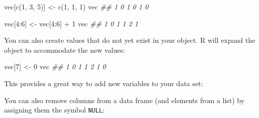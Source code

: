 \documentclass[
  letterpaper,
  DIV=11,
  numbers=noendperiod]{scrbook}
\newenvironment{Shaded}{\begin{snugshade}}{\end{snugshade}}
\newcommand{\ConstantTok}[1]{\textcolor[rgb]{0.56,0.35,0.01}{#1}}
\newcommand{\DecValTok}[1]{\textcolor[rgb]{0.68,0.00,0.00}{#1}}
\newcommand{\DocumentationTok}[1]{\textcolor[rgb]{0.37,0.37,0.37}{\textit{#1}}}
\newcommand{\FunctionTok}[1]{\textcolor[rgb]{0.28,0.35,0.67}{#1}}
\newcommand{\NormalTok}[1]{\textcolor[rgb]{0.00,0.23,0.31}{#1}}
\newcommand{\OtherTok}[1]{\textcolor[rgb]{0.00,0.23,0.31}{#1}}
\newcommand{\SpecialCharTok}[1]{\textcolor[rgb]{0.37,0.37,0.37}{#1}}
\begin{document}
\begin{Shaded}
\begin{Highlighting}[]
\NormalTok{vec[}\FunctionTok{c}\NormalTok{(}\DecValTok{1}\NormalTok{, }\DecValTok{3}\NormalTok{, }\DecValTok{5}\NormalTok{)] }\OtherTok{\textless{}{-}} \FunctionTok{c}\NormalTok{(}\DecValTok{1}\NormalTok{, }\DecValTok{1}\NormalTok{, }\DecValTok{1}\NormalTok{)}
\NormalTok{vec}
\DocumentationTok{\#\#  1 0 1 0 1 0}

\NormalTok{vec[}\DecValTok{4}\SpecialCharTok{:}\DecValTok{6}\NormalTok{] }\OtherTok{\textless{}{-}}\NormalTok{ vec[}\DecValTok{4}\SpecialCharTok{:}\DecValTok{6}\NormalTok{] }\SpecialCharTok{+} \DecValTok{1}
\NormalTok{vec}
\DocumentationTok{\#\# 1 0 1 1 2 1}
\end{Highlighting}
\end{Shaded}

You can also create values that do not yet exist in your object. R will
expand the object to accommodate the new values:

\begin{Shaded}
\begin{Highlighting}[]
\NormalTok{vec[}\DecValTok{7}\NormalTok{] }\OtherTok{\textless{}{-}} \DecValTok{0}
\NormalTok{vec}
\DocumentationTok{\#\# 1 0 1 1 2 1 0}
\end{Highlighting}
\end{Shaded}

This provides a great way to add new variables to your data set:

\begin{Shaded}
\end{Shaded}

You can also remove columns from a data frame (and elements from a list)
by assigning them the symbol \texttt{NULL}:

\begin{Shaded}
\end{Shaded}
\end{document}
